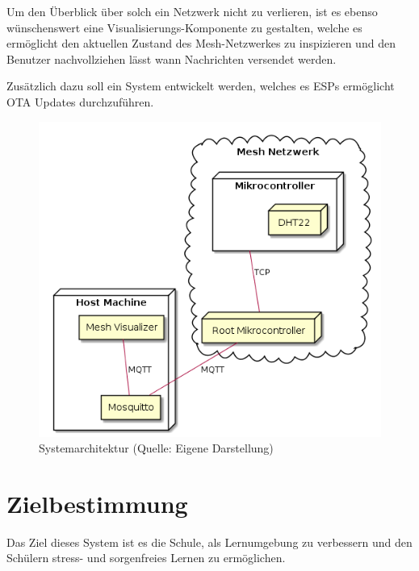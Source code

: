 Um den Überblick über solch ein Netzwerk nicht zu verlieren, ist es ebenso wünschenswert eine Visualisierungs-Komponente zu gestalten, welche es ermöglicht den aktuellen Zustand des Mesh-Netzwerkes zu inspizieren und den Benutzer nachvollziehen lässt wann Nachrichten versendet werden.

Zusätzlich dazu soll ein System entwickelt werden, welches es ESPs ermöglicht OTA Updates durchzuführen.

\begin{figure}[H]
    \centering
    \includegraphics[scale=0.5]{diagrams/deployment.png}
    \caption{Systemarchitektur (Quelle: Eigene Darstellung)}
    \label{abb:deployment}
\end{figure}

\section{Zielbestimmung}
Das Ziel dieses System ist es die Schule, als Lernumgebung zu verbessern und den Schülern stress- und sorgenfreies Lernen zu ermöglichen.